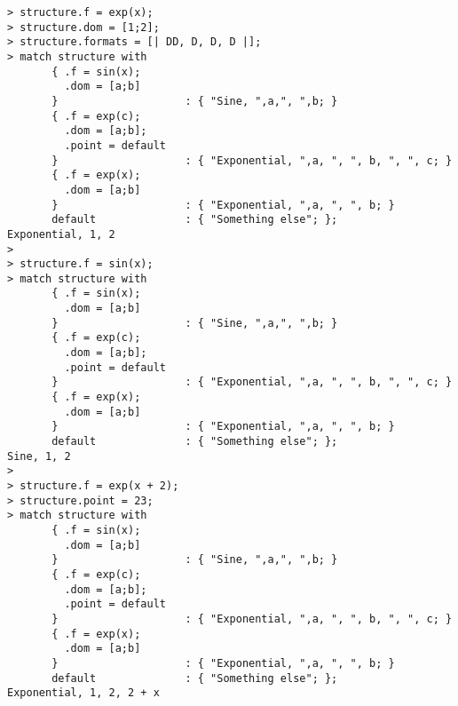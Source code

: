 \begin{center}\begin{minipage}{15cm}\begin{Verbatim}[frame=single]
> structure.f = exp(x);
> structure.dom = [1;2];
> structure.formats = [| DD, D, D, D |];
> match structure with 
       { .f = sin(x);
         .dom = [a;b]
       }                    : { "Sine, ",a,", ",b; }
       { .f = exp(c);
         .dom = [a;b];
         .point = default 
       }                    : { "Exponential, ",a, ", ", b, ", ", c; }
       { .f = exp(x);
         .dom = [a;b]
       }                    : { "Exponential, ",a, ", ", b; }
       default              : { "Something else"; };
Exponential, 1, 2
> 
> structure.f = sin(x);
> match structure with 
       { .f = sin(x);
         .dom = [a;b]
       }                    : { "Sine, ",a,", ",b; }
       { .f = exp(c);
         .dom = [a;b];
         .point = default 
       }                    : { "Exponential, ",a, ", ", b, ", ", c; }
       { .f = exp(x);
         .dom = [a;b]
       }                    : { "Exponential, ",a, ", ", b; }
       default              : { "Something else"; };
Sine, 1, 2
> 
> structure.f = exp(x + 2);
> structure.point = 23;
> match structure with 
       { .f = sin(x);
         .dom = [a;b]
       }                    : { "Sine, ",a,", ",b; }
       { .f = exp(c);
         .dom = [a;b];
         .point = default 
       }                    : { "Exponential, ",a, ", ", b, ", ", c; }
       { .f = exp(x);
         .dom = [a;b]
       }                    : { "Exponential, ",a, ", ", b; }
       default              : { "Something else"; };
Exponential, 1, 2, 2 + x
\end{Verbatim}
\end{minipage}\end{center}
